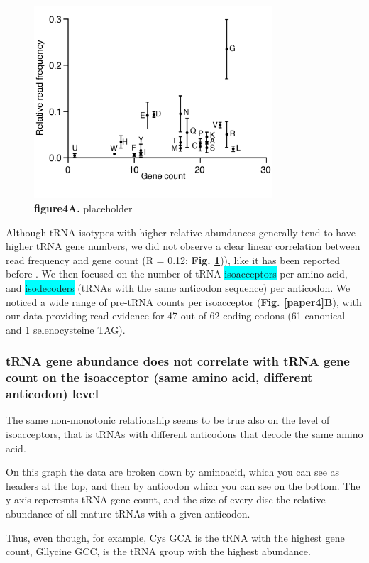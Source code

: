 \documentclass[12pt]{rockefeller}
\newcommand{\cyan}[1]{\colorbox{cyan}{#1}}
\begin{document}
\begin{figure}[!ht]%
\centering
\includegraphics[width=3.5in]{paper4A.png}%
\caption[figure4A]
{\textbf{figure4A.}
placeholder}
\centering
\label{paper4A}%
\end{figure}

Although tRNA isotypes with higher relative abundances generally tend to have higher tRNA gene numbers, we did not observe a clear linear correlation between read frequency and gene count (R = 0.12; \textbf{Fig. \ref{paper4A}})), like it has been reported before \cite{Tuller:2010ge}. We then focused on the number of tRNA \cyan{isoacceptors} per amino acid, and \cyan{isodecoders} (tRNAs with the same anticodon sequence) per anticodon. We noticed a wide range of pre-tRNA counts per isoacceptor (\textbf{Fig. \ref{paper4}B}), with our data providing read evidence for 47 out of 62 coding codons (61 canonical and 1 selenocysteine TAG). 

\subsubsection{tRNA gene abundance does not correlate with tRNA gene count on the isoacceptor (same amino acid, different anticodon) level}
The same non-monotonic relationship seems to be true also on the level of isoacceptors, that is tRNAs with different anticodons that decode the same amino acid. 

On this graph the data are broken down by aminoacid, which you can see as headers at the top, and then by anticodon which you can see on the bottom. The y-axis reperesnts tRNA gene count, and the size of every disc the relative abundance of all mature tRNAs with a given anticodon. 

Thus, even though, for example, Cys GCA is the tRNA with the highest gene count, Gllycine GCC, is the tRNA group with the highest abundance. 
\end{document}
